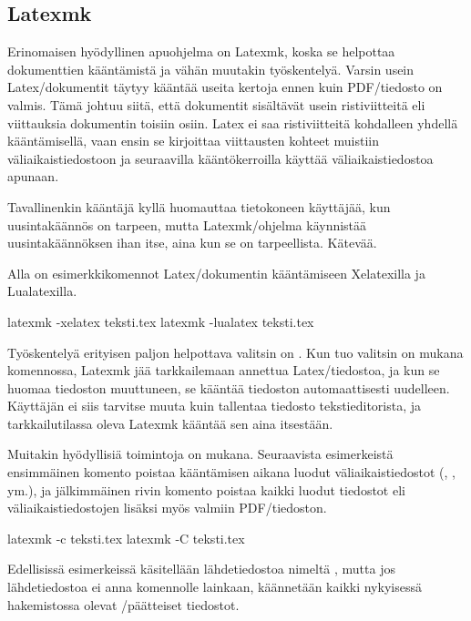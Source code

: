 \subsection{Latexmk}

Erin\-omaisen hyödyllinen apu\-ohjelma on Latexmk, koska se helpottaa
dokumenttien kääntämistä ja vähän muutakin työskentelyä. Varsin usein
Latex\-/dokumentit täytyy kääntää useita kertoja ennen kuin
PDF\-/tiedosto on valmis. Tämä johtuu siitä, että dokumentit sisältävät
usein ristiviitteitä eli viittauksia dokumentin toisiin osiin. Latex ei
saa ristiviitteitä kohdalleen yhdellä kääntämisellä, vaan ensin se
kirjoittaa viittausten kohteet muistiin väliaikaistiedostoon ja
seuraavilla kääntökerroilla käyttää väliaikaistiedostoa apunaan.

Tavallinenkin kääntäjä kyllä huomauttaa tietokoneen käyttäjää, kun
uusintakäännös on tarpeen, mutta Latexmk\-/ohjelma käynnistää
uusintakäännöksen ihan itse, aina kun se on tarpeellista. Kätevää.

Alla on esimerkkikomennot Latex\-/dokumentin kääntämiseen Xelatexilla ja
Lualatexilla.

\begin{koodilohkosis}
  latexmk -xelatex  teksti.tex
  latexmk -lualatex teksti.tex
\end{koodilohkosis}

Työskentelyä erityisen paljon helpottava valitsin on . Kun
tuo valitsin on mukana komennossa, Latexmk jää tarkkailemaan annettua
Latex\-/tiedostoa, ja kun se huomaa tiedoston muuttuneen, se kääntää
tiedoston automaattisesti uudelleen. Käyttäjän ei siis tarvitse muuta
kuin tallentaa tiedosto tekstieditorista, ja tarkkailutilassa oleva
Latexmk kääntää sen aina itsestään.

Muitakin hyödyllisiä toimintoja on mukana. Seuraavista esimerkeistä
ensimmäinen komento poistaa kääntämisen aikana luodut
väliaikaistiedostot (, ,  ym.), ja
jälkimmäinen rivin komento poistaa kaikki luodut tiedostot eli
väliaikaistiedostojen lisäksi myös valmiin PDF\-/tiedoston.

\begin{koodilohkosis}
  latexmk -c teksti.tex
  latexmk -C teksti.tex
\end{koodilohkosis}

Edellisissä esimerkeissä käsitellään lähdetiedostoa nimeltä
, mutta jos lähdetiedostoa ei anna komennolle
lainkaan, käännetään kaikki nykyisessä hakemistossa olevat
\-/päätteiset tiedostot.

